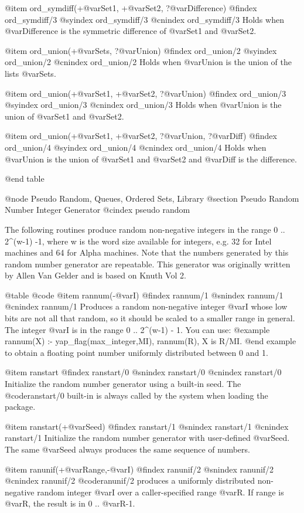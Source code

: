 {{{{{{{{{@item ord_symdiff(+@var{Set1}, +@var{Set2}, ?@var{Difference})
@findex ord_symdiff/3
@syindex ord_symdiff/3
@cnindex ord_symdiff/3
Holds when @var{Difference} is the symmetric difference of @var{Set1}
and @var{Set2}.

@item ord_union(+@var{Sets}, ?@var{Union})
@findex ord_union/2
@syindex ord_union/2
@cnindex ord_union/2
Holds when @var{Union} is the union of the lists @var{Sets}.

@item ord_union(+@var{Set1}, +@var{Set2}, ?@var{Union})
@findex ord_union/3
@syindex ord_union/3
@cnindex ord_union/3
Holds when @var{Union} is the union of @var{Set1} and @var{Set2}.

@item ord_union(+@var{Set1}, +@var{Set2}, ?@var{Union}, ?@var{Diff})
@findex ord_union/4
@syindex ord_union/4
@cnindex ord_union/4
Holds when @var{Union} is the union of @var{Set1} and @var{Set2} and
@var{Diff} is the difference.

@end table

@node Pseudo Random, Queues, Ordered Sets, Library
@section Pseudo Random Number Integer Generator
@cindex pseudo random

The following routines produce random non-negative integers in the range
0 .. 2^(w-1) -1, where w is the word size available for integers, e.g.
32 for Intel machines and 64 for Alpha machines. Note that the numbers
generated by this random number generator are repeatable. This generator
was originally written by Allen Van Gelder and is based on Knuth Vol 2.

@table @code 
@item rannum(-@var{I})
@findex rannum/1
@snindex rannum/1
@cnindex rannum/1
Produces a random non-negative integer @var{I} whose low bits are not
all that random, so it should be scaled to a smaller range in general.
The integer @var{I} is in the range 0 .. 2^(w-1) - 1. You can use:
@example
rannum(X) :- yap_flag(max_integer,MI), rannum(R), X is R/MI.
@end example
to obtain a floating point number uniformly distributed between 0 and 1.

@item ranstart
@findex ranstart/0
@snindex ranstart/0
@cnindex ranstart/0
Initialize the random number generator using a built-in seed. The
@code{ranstart/0} built-in is always called by the system when loading
the package.

@item ranstart(+@var{Seed})
@findex ranstart/1
@snindex ranstart/1
@cnindex ranstart/1
Initialize the random number generator with user-defined @var{Seed}. The
same @var{Seed} always produces the same sequence of numbers.

@item ranunif(+@var{Range},-@var{I})
@findex ranunif/2
@snindex ranunif/2
@cnindex ranunif/2
@code{ranunif/2} produces a uniformly distributed non-negative random
integer @var{I} over a caller-specified range @var{R}.  If range is @var{R},
the result is in 0 .. @var{R}-1.

}}}}}}}}}
